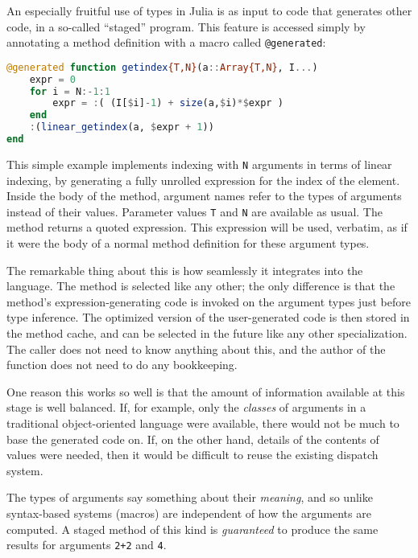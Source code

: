 An especially fruitful use of types in Julia is as input to code that
generates other code, in a so-called ``staged'' program.
This feature is accessed simply by annotating a method definition
with a macro called \texttt{@generated}:

\begin{singlespace}
\begin{lstlisting}[language=julia]
@generated function getindex{T,N}(a::Array{T,N}, I...)
    expr = 0
    for i = N:-1:1
        expr = :( (I[$i]-1) + size(a,$i)*$expr )
    end
    :(linear_getindex(a, $expr + 1))
end
\end{lstlisting}
\end{singlespace}



\noindent
This simple example implements indexing with \texttt{N} arguments
in terms of linear indexing, by generating a fully unrolled expression
for the index of the element.
Inside the body of the method, argument names refer to the types of
arguments instead of their values.
Parameter values \texttt{T} and \texttt{N} are available as usual.
The method returns a quoted expression.
This expression will be used, verbatim, as if it were the body of
a normal method definition for these argument types.

The remarkable thing about this is how seamlessly it integrates into
the language.
The method is selected like any other; the only difference is that
the method's expression-generating code is invoked on the argument types
just before type inference.
The optimized version of the user-generated code is then stored in the method
cache, and can be selected in the future like any other specialization.
The caller does not need to know anything about this, and the author
of the function does not need to do any bookkeeping.

One reason this works so well is that the amount of information
available at this stage is well balanced.
If, for example, only the \emph{classes} of arguments in a traditional
object-oriented language were available, there would not be much
to base the generated code on.
If, on the other hand, details of the contents of values were needed,
then it would be difficult to reuse the existing dispatch system.

The types of arguments say something about their \emph{meaning},
and so unlike syntax-based systems (macros) are independent of how
the arguments are computed.
A staged method of this kind is \emph{guaranteed} to produce the
same results for arguments \texttt{2+2} and \texttt{4}.

